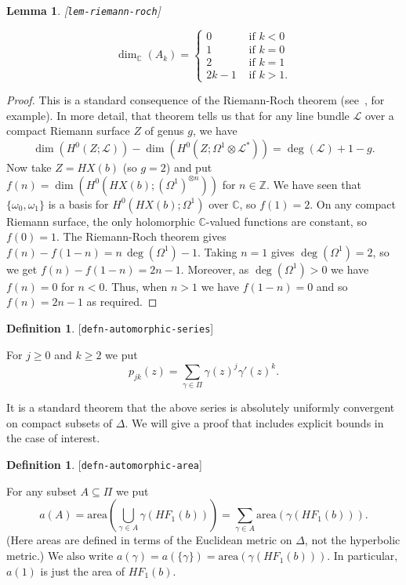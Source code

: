 \documentclass[reqno]{amsart}
\newcommand{\lbl}[1]{\label{#1}\textup{[\texttt{#1}]}\par}
\newcommand{\lbl}{\label}
\newcommand{\Dl}        {\Delta}
\newcommand{\Om}        {\Omega}
\newcommand{\gm}        {\gamma}
\newcommand{\om}        {\omega}
\newcommand{\Z}         {{\mathbb{Z}}}
\newcommand{\C}         {{\mathbb{C}}}
\newcommand{\sse}       {\subseteq}
\newcommand{\ot}        {\otimes}
\newcommand{\CL}        {\mathcal{L}}
\renewcommand{\:}{\colon}
\newtheorem{lemma}[theorem]{Lemma}
\theoremstyle{definition}
\newtheorem{definition}[theorem]{Definition}
\begin{document}
\begin{lemma}\lbl{lem-riemann-roch}
 \[ \dim_\C(A_k) = \begin{cases}
     0 & \text{ if } k < 0 \\
     1 & \text{ if } k = 0 \\
     2 & \text{ if } k = 1 \\
     2k-1 & \text{ if } k > 1.
    \end{cases}
 \]
\end{lemma}
\begin{proof}
 This is a standard consequence of the Riemann-Roch theorem
 (see~\cite[Section IV.1]{ha:ag}, for example).  In more
 detail, that theorem tells us that for any line bundle $\CL$ over a
 compact Riemann surface $Z$ of genus $g$, we have
 \[ \dim(H^0(Z;\CL)) - \dim(H^0(Z;\Om^1\ot\CL^*)) =
     \deg(\CL) + 1 - g.
 \]
 Now take $Z=HX(b)$ (so $g=2$) and put
 $f(n)=\dim(H^0(HX(b);(\Om^1)^{\ot n}))$ for $n\in\Z$.  We have seen
 that $\{\om_0,\om_1\}$ is a basis for $H^0(HX(b);\Om^1)$ over $\C$,
 so $f(1)=2$.  On any compact Riemann surface, the only holomorphic
 $\C$-valued functions are constant, so $f(0)=1$.  The Riemann-Roch
 theorem gives $f(n)-f(1-n)=n\,\deg(\Om^1)-1$.  Taking $n=1$ gives
 $\deg(\Om^1)=2$, so we get $f(n)-f(1-n)=2n-1$.  Moreover, as
 $\deg(\Om^1)>0$ we have $f(n)=0$ for $n<0$.  Thus, when $n>1$ we have
 $f(1-n)=0$ and so $f(n)=2n-1$ as required.
\end{proof}

\begin{definition}\lbl{defn-automorphic-series}
 For $j\geq 0$ and $k\geq 2$ we put
 \[ p_{jk}(z) = \sum_{\gm\in\Pi} \gm(z)^j\gm'(z)^k. \]
\end{definition}

It is a standard theorem that the above series is absolutely uniformly
convergent on compact subsets of $\Dl$.  We will give a proof that
includes explicit bounds in the case of interest.

\begin{definition}\lbl{defn-automorphic-area}
 For any subset $A\sse\Pi$ we put
 \[ a(A) =
     \text{area}\left(\bigcup_{\gm\in A}\gm(HF_1(b))\right) =
     \sum_{\gm\in A}\text{area}(\gm(HF_1(b))).
 \]
 (Here areas are defined in terms of the Euclidean metric on $\Dl$,
 not the hyperbolic metric.)  We also write
 $a(\gm)=a(\{\gm\})=\text{area}(\gm(HF_1(b)))$.  In particular,
 $a(1)$ is just the area of $HF_1(b)$.
\end{definition}
\end{document}
